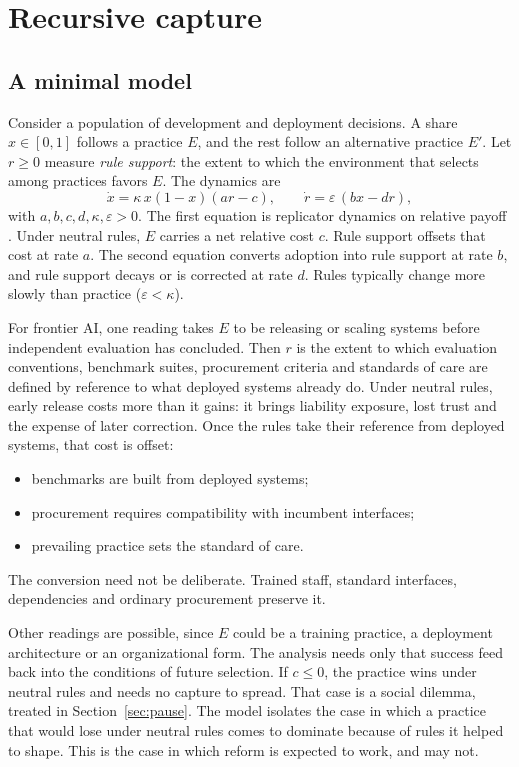 \documentclass[11pt]{article}
\theoremstyle{plain}
\theoremstyle{definition}
\begin{document}
\section{Recursive capture}\label{sec:capture}

\subsection{A minimal model}

Consider a population of development and deployment decisions. A share $x\in[0,1]$ follows a practice $E$, and the rest follow an alternative practice $E'$. Let $r\ge 0$ measure \emph{rule support}: the extent to which the environment that selects among practices favors $E$. The dynamics are
\begin{equation}\label{eq:core}
\dot x=\kappa\, x(1-x)(ar-c),\qquad \dot r=\varepsilon\,(bx-dr),
\end{equation}
with $a,b,c,d,\kappa,\varepsilon>0$. The first equation is replicator dynamics on relative payoff \citep{hofbauer1998}. Under neutral rules, $E$ carries a net relative cost $c$. Rule support offsets that cost at rate $a$. The second equation converts adoption into rule support at rate $b$, and rule support decays or is corrected at rate $d$. Rules typically change more slowly than practice ($\varepsilon<\kappa$).

For frontier AI, one reading takes $E$ to be releasing or scaling systems before independent evaluation has concluded. Then $r$ is the extent to which evaluation conventions, benchmark suites, procurement criteria and standards of care are defined by reference to what deployed systems already do. Under neutral rules, early release costs more than it gains: it brings liability exposure, lost trust and the expense of later correction. Once the rules take their reference from deployed systems, that cost is offset:
\begin{itemize}[leftmargin=*]
\item benchmarks are built from deployed systems;
\item procurement requires compatibility with incumbent interfaces;
\item prevailing practice sets the standard of care.
\end{itemize}
The conversion need not be deliberate. Trained staff, standard interfaces, dependencies and ordinary procurement preserve it.

Other readings are possible, since $E$ could be a training practice, a deployment architecture or an organizational form. The analysis needs only that success feed back into the conditions of future selection. If $c\le 0$, the practice wins under neutral rules and needs no capture to spread. That case is a social dilemma, treated in Section~\ref{sec:pause}. The model isolates the case in which a practice that would lose under neutral rules comes to dominate because of rules it helped to shape. This is the case in which reform is expected to work, and may not.
\end{document}
